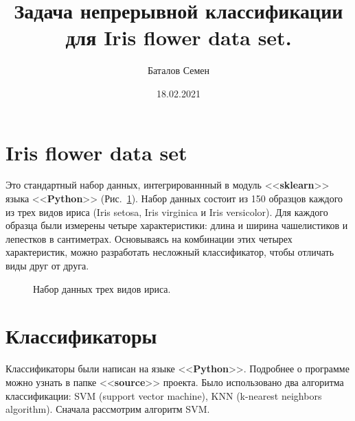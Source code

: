 \documentclass[12pt, a4paper]{article}
\title{Задача непрерывной классификации для Iris flower data set.}
\author{Баталов Семен}
\date{18.02.2021}
\begin{document}
    
    \sloppy
    
    \maketitle
    
    \section{Iris flower data set}
    
    Это стандартный набор данных, интегрированнный в модуль <<\textbf{sklearn}>> 
    языка <<\textbf{Python}>> (Рис.~\ref{image1}). Набор данных состоит из 150 
    образцов каждого из трех видов ириса (Iris setosa, Iris virginica и Iris 
    versicolor). Для каждого образца были измерены четыре характеристики: длина и 
    ширина чашелистиков и лепестков в сантиметрах. Основываясь на комбинации этих 
    четырех характеристик, можно разработать несложный классификатор, чтобы отличать 
    виды друг от друга.
    
    \begin{figure} [h]
        \caption{Набор данных трех видов ириса.}
        \label{image1}
    \end{figure}
    
    \section{Классификаторы}
    
    Классификаторы были написан на языке <<\textbf{Python}>>. Подробнее о программе 
    можно узнать в папке <<\textbf{source}>> проекта. Было использовано два алгоритма 
    классификации: SVM (support vector machine), KNN (k-nearest neighbors algorithm). 
    Сначала рассмотрим алгоритм SVM.
    
\end{document}
